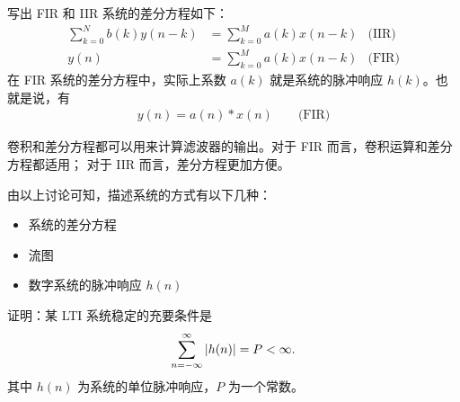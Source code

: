\begin{property}[差分方程与卷积运算]
    \label{property:diff-equation-convolution}
    写出 FIR 和 IIR 系统的差分方程如下：
    \begin{align*}
        \sum_{k = 0}^{N}b(k)y(n - k) & = \sum_{k = 0}^{M}a(k)x(n - k) & \text{(IIR)} \\
        y(n) & = \sum_{k = 0}^{M}a(k)x(n - k) & \text{(FIR)}
    \end{align*}
    在 FIR 系统的差分方程中，实际上系数 $a(k)$ 就是系统的脉冲响应 $h(k)$。也就是说，有
    \begin{align*}
        y(n) = a(n) * x(n) \qquad \text{(FIR)}
    \end{align*}

    卷积和差分方程都可以用来计算滤波器的输出。对于 FIR 而言，卷积运算和差分方程都适用；
    对于 IIR 而言，差分方程更加方便。
\end{property}

\begin{remark}
    由以上讨论可知，描述系统的方式有以下几种：
    \begin{itemize}
        \item 系统的差分方程
        \item 流图
        \item 数字系统的脉冲响应 $h(n)$
    \end{itemize}
\end{remark}

\begin{exercise}
    \label{exercise:LTI-stable}
    证明：某 LTI 系统稳定的充要条件是
    \begin{align*}
        \sum_{n = -\infty}^{\infty} \left|h(n)\right| = P < \infty.
    \end{align*}
    其中 $h(n)$ 为系统的单位脉冲响应，$P$ 为一个常数。
\end{exercise}

